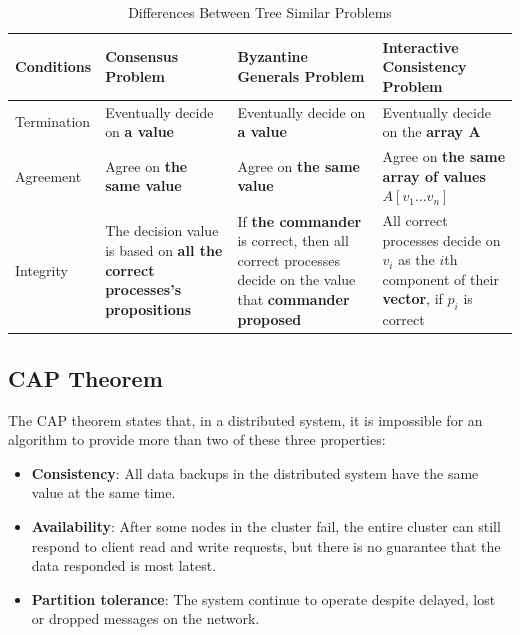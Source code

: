 \documentclass[12pt, a4paper]{article}
\begin{document}
\begin{table}[htp]
  \centering
  \begin{tabular}{|l|p{3.5cm}|p{3.5cm}|p{3.5cm}|}
  \hline
  Conditions & Consensus Problem & Byzantine Generals Problem
    & Interactive Consistency Problem \\
  \hline
  Termination & Eventually decide on \textbf{a value}
    & Eventually decide on \textbf{a value}
    & Eventually decide on the \textbf{array A} \\
  \hline
  Agreement & Agree on \textbf{the same value}
    & Agree on \textbf{the same value}
    & Agree on \textbf{the same array of values $A[v_{1}...v_{n}]$} \\
  \hline
  Integrity
    & The decision value is based on
      \textbf{all the correct processes's propositions}
    & If \textbf{the commander} is correct, then all correct processes decide
      on the value that \textbf{commander proposed}
    & All correct processes decide on $v_{i}$ as the ${i}$th component of their
      \textbf{vector}, if $p_{i}$ is correct \\ \hline
  \end{tabular}
  \caption{Differences Between Tree Similar Problems}
  \label{tab:dbtap}
\end{table}

\subsection{CAP Theorem}

The CAP theorem \cite{brewer2012cap} states that, in a distributed system, it is
impossible for an algorithm to provide more than two of these three properties:

\begin{itemize}
	\item \textbf{Consistency}: All data backups in the distributed system have
    the same value at the same time.
	\item \textbf{Availability}: After some nodes in the cluster fail, the entire
    cluster can still respond to client read and write requests, but there is no
    guarantee that the data responded is most latest.
	\item \textbf{Partition tolerance}: The system continue to operate despite
    delayed, lost or dropped messages on the network.
\end{itemize}

\end{document}
